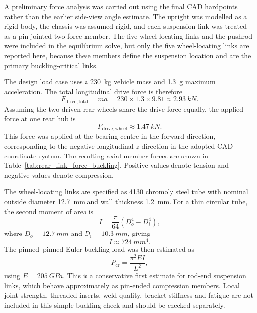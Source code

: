 A preliminary force analysis was carried out using the final CAD hardpoints rather than the earlier side-view angle estimate. The upright was modelled as a rigid body, the chassis was assumed rigid, and each suspension link was treated as a pin-jointed two-force member. The five wheel-locating links and the pushrod were included in the equilibrium solve, but only the five wheel-locating links are reported here, because these members define the suspension location and are the primary buckling-critical links.

The design load case uses a \SI{230}{kg} vehicle mass and \SI{1.3}{g} maximum acceleration. The total longitudinal drive force is therefore
\begin{equation}
F_{\mathrm{drive,total}} = ma
= 230 \times 1.3 \times 9.81
\approx \SI{2.93}{kN}.
\end{equation}
Assuming the two driven rear wheels share the drive force equally, the applied force at one rear hub is
\begin{equation}
F_{\mathrm{drive,wheel}} \approx \SI{1.47}{kN}.
\end{equation}
This force was applied at the bearing centre in the forward direction, corresponding to the negative longitudinal \(z\)-direction in the adopted CAD coordinate system. The resulting axial member forces are shown in Table~\ref{tab:rear_link_force_buckling}. Positive values denote tension and negative values denote compression.

The wheel-locating links are specified as 4130 chromoly steel tube with nominal outside diameter \SI{12.7}{mm} and wall thickness \SI{1.2}{mm}. For a thin circular tube, the second moment of area is
\begin{equation}
I = \frac{\pi}{64}\left(D_o^4-D_i^4\right),
\end{equation}
where \(D_o=\SI{12.7}{mm}\) and \(D_i=\SI{10.3}{mm}\), giving
\begin{equation}
I \approx \SI{724}{mm^4}.
\end{equation}
The pinned--pinned Euler buckling load was then estimated as
\begin{equation}
P_{\mathrm{cr}} = \frac{\pi^2 E I}{L^2},
\end{equation}
using \(E=\SI{205}{GPa}\). This is a conservative first estimate for rod-end suspension links, which behave approximately as pin-ended compression members. Local joint strength, threaded inserts, weld quality, bracket stiffness and fatigue are not included in this simple buckling check and should be checked separately.

